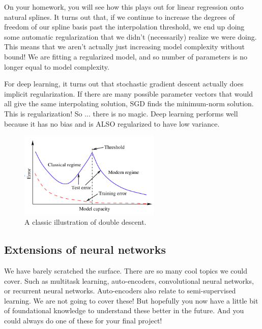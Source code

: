 On your homework, you will see how this plays out for linear regression onto natural splines. It turns out that, if we continue to increase the degrees of freedom of our spline basis past the interpolation threshold, we end up doing some automatic regularization that we didn't (necessarily) realize we were doing. This means that we aren't actually just increasing model complexity without bound! We are fitting a regularized model, and so number of parameters is no longer equal to model complexity. 

For deep learning, it turns out that stochastic gradient descent actually does implicit regularization. If there are many possible parameter vectors that would all give the same interpolating solution, SGD finds the minimum-norm solution. This is regularization! So ... there is no magic. Deep learning performs well because it has no bias and is ALSO regularized to have low variance. 

\begin{figure}
\centering 
\includegraphics[width=0.6\textwidth]{442_lecs/dd.png}
\caption{A classic illustration of double descent.}	
\label{fig_dd}
\end{figure}


\subsection{Extensions of neural networks}

We have barely scratched the surface. There are so many cool topics we could cover. Such as multitask learning, auto-encoders, convolutional neural networks, or recurrent neural networks. Auto-encoders also relate to semi-supervised learning. We are not going to cover these! But hopefully you now have a little bit of foundational knowledge to understand these better in the future. And you could always do one of these for your final project!





